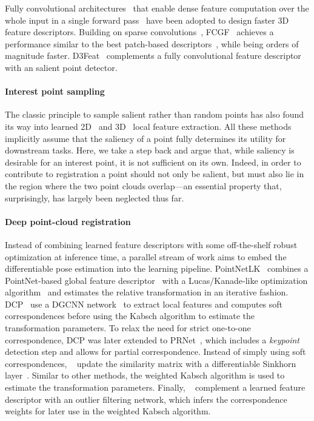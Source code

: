 Fully convolutional architectures~\cite{long2015fully} that enable dense feature computation over the whole input in a single forward pass~\cite{detone2018superpoint, dusmanu2019d2Net, revaud2019r2d2} have been adopted to design faster 3D feature descriptors. Building on sparse convolutions~\cite{choy2019Minkowski}, FCGF~\cite{Choy2019FCGF} achieves
a performance similar to the best patch-based descriptors~\cite{gojcic20193DSmoothNet}, while being orders of magnitude faster. D3Feat~\cite{bai2020d3feat} complements
a fully convolutional feature descriptor with an salient point detector. 


\paragraph{Interest point sampling} 
The classic principle to sample salient rather than random  points
has also found its way into learned 2D~\cite{detone2018superpoint, dusmanu2019d2Net,revaud2019r2d2, wiles2020d2d} and 3D~\cite{yew20183dfeat, bai2020d3feat,lu2020rskdd} local feature extraction.
All these methods implicitly assume that the saliency of a point fully determines its utility for downstream tasks. Here, we take a step back and argue that, while saliency is desirable for an interest point, it is not sufficient on its own. Indeed, in order to contribute to registration a point should not only be salient, but must also lie in the region where the two point clouds overlap---an essential property that, surprisingly, has largely been neglected thus far.


\paragraph{Deep point-cloud registration} 
Instead of combining learned feature descriptors with some
off-the-shelf robust optimization at inference time, a parallel stream of work aims to embed the differentiable pose estimation into the learning pipeline. PointNetLK~\cite{aoki2019pointnetlk} combines a PointNet-based global feature descriptor~\cite{qi2017pointnet} with a Lucas/Kanade-like optimization algorithm~\cite{lucas1981LK} and estimates the relative transformation in an iterative fashion.
DCP~\cite{wang2019dcp} use a DGCNN network~\cite{wang2019dynamic} to extract local features and computes soft correspondences before using the Kabsch algorithm to estimate the transformation parameters. To relax the need for strict one-to-one correspondence, DCP was later extended to PRNet~\cite{wang2019prnet}, which includes a \textit{keypoint} detection step and allows for partial correspondence. Instead of simply using soft correspondences, ~\cite{yew2020rpm} %
update the similarity matrix with a differentiable Sinkhorn layer~\cite{sinkhorn1964relationship}. Similar to other methods, the weighted Kabsch algorithm\cite{4767965} is used to estimate the transformation parameters. Finally, ~\cite{gojcic2020learning,choy2020deep,pais20203dregnet}
complement a learned feature descriptor with an outlier filtering network, which infers the correspondence weights for later use in the weighted Kabsch algorithm. 



